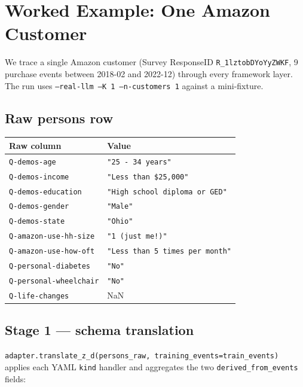 \documentclass[11pt,a4paper]{article}
\begin{document}
\section{Worked Example: One Amazon Customer}
\label{sec:example}

We trace a single Amazon customer (Survey ResponseID
\texttt{R\_1lztobDYoYyZWKF}, 9 purchase events between 2018-02 and
2022-12) through every framework layer. The run uses
\texttt{--real-llm --K 1 --n-customers 1} against a mini-fixture.

\subsection{Raw persons row}

\begin{center}
\small
\begin{tabular}{@{}l l@{}}
\toprule
Raw column & Value \\
\midrule
\texttt{Q-demos-age}          & \texttt{"25 - 34 years"} \\
\texttt{Q-demos-income}       & \texttt{"Less than \$25,000"} \\
\texttt{Q-demos-education}    & \texttt{"High school diploma or GED"} \\
\texttt{Q-demos-gender}       & \texttt{"Male"} \\
\texttt{Q-demos-state}        & \texttt{"Ohio"} \\
\texttt{Q-amazon-use-hh-size} & \texttt{"1 (just me!)"} \\
\texttt{Q-amazon-use-how-oft} & \texttt{"Less than 5 times per month"} \\
\texttt{Q-personal-diabetes}  & \texttt{"No"} \\
\texttt{Q-personal-wheelchair}& \texttt{"No"} \\
\texttt{Q-life-changes}       & NaN \\
\bottomrule
\end{tabular}
\end{center}

\subsection{Stage 1 — schema translation}

\texttt{adapter.translate\_z\_d(persons\_raw,
training\_events=train\_events)} applies each YAML \texttt{kind}
handler and aggregates the two \texttt{derived\_from\_events} fields:
\end{document}
